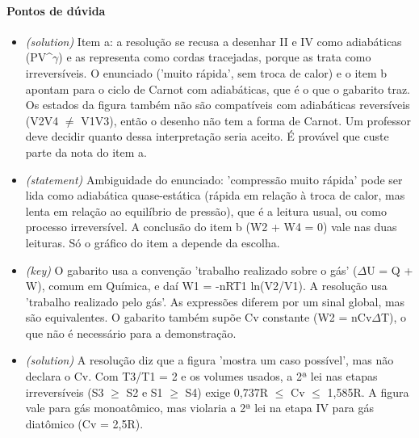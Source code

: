 \documentclass{article}%
\begin{document}
\paragraph{Pontos de dúvida}%
\begin{itemize}%
\item%
\textit{(solution)} Item a: a resolução se recusa a desenhar II e IV como adiabáticas (PV\^{}$\gamma$) e as representa como cordas tracejadas, porque as trata como irreversíveis. O enunciado ('muito rápida', sem troca de calor) e o item b apontam para o ciclo de Carnot com adiabáticas, que é o que o gabarito traz. Os estados da figura também não são compatíveis com adiabáticas reversíveis (V2V4 $\neq$ V1V3), então o desenho não tem a forma de Carnot. Um professor deve decidir quanto dessa interpretação seria aceito. É provável que custe parte da nota do item a.%
\item%
\textit{(statement)} Ambiguidade do enunciado: 'compressão muito rápida' pode ser lida como adiabática quase{-}estática (rápida em relação à troca de calor, mas lenta em relação ao equilíbrio de pressão), que é a leitura usual, ou como processo irreversível. A conclusão do item b (W2 + W4 = 0) vale nas duas leituras. Só o gráfico do item a depende da escolha.%
\item%
\textit{(key)} O gabarito usa a convenção 'trabalho realizado sobre o gás' ($\Delta$U = Q + W), comum em Química, e daí W1 = -nRT1 ln(V2/V1). A resolução usa 'trabalho realizado pelo gás'. As expressões diferem por um sinal global, mas são equivalentes. O gabarito também supõe Cv constante (W2 = nCv$\Delta$T), o que não é necessário para a demonstração.%
\item%
\textit{(solution)} A resolução diz que a figura 'mostra um caso possível', mas não declara o Cv. Com T3/T1 = 2 e os volumes usados, a 2ª lei nas etapas irreversíveis (S3 $\geq$ S2 e S1 $\geq$ S4) exige 0,737R $\leq$ Cv $\leq$ 1,585R. A figura vale para gás monoatômico, mas violaria a 2ª lei na etapa IV para gás diatômico (Cv = 2,5R).%
\end{itemize}%
\end{document}

